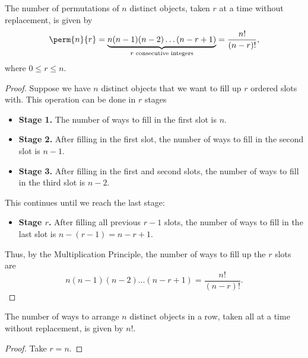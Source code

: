 \begin{proposition}
    The number of permutations of $n$ distinct objects, taken $r$ at a time without replacement, is given by \[\perm{n}{r} = \underbrace{n(n-1)(n-2)\dots(n-r+1)}_{\text{$r$ consecutive integers}} = \frac{n!}{(n-r)!},\] where $0 \leq r \leq n$.
\end{proposition}
\begin{proof}
    Suppose we have $n$ distinct objects that we want to fill up $r$ ordered slots with. This operation can be done in $r$ stages
    \begin{itemize}
        \item \textbf{Stage 1.} The number of ways to fill in the first slot is $n$.
        \item \textbf{Stage 2.} After filling in the first slot, the number of ways to fill in the second slot is $n-1$.
        \item \textbf{Stage 3.} After filling in the first and second slots, the number of ways to fill in the third slot is $n-2$.
    \end{itemize}
    This continues until we reach the last stage:
    \begin{itemize}
        \item \textbf{Stage $r$.} After filling all previous $r-1$ slots, the number of ways to fill in the last slot is $n-(r-1) = n-r+1$.
    \end{itemize}
    Thus, by the Multiplication Principle, the number of ways to fill up the $r$ slots are \[n(n-1)(n-2)\dots(n-r+1) = \frac{n!}{(n-r)!}.\]
\end{proof}

\begin{corollary}
    The number of ways to arrange $n$ distinct objects in a row, taken all at a time without replacement, is given by $n!$.
\end{corollary}
\begin{proof}
    Take $r = n$.
\end{proof}


